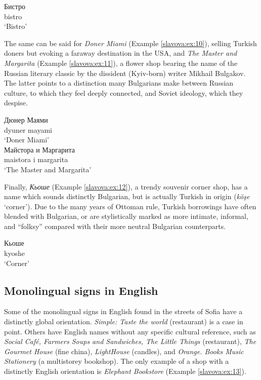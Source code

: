 \documentclass[output=paper]{langscibook}
\begin{document}
\begin{exe}
  \ex\label{slavova:ex:9}
  \gll Бистро \\
  bistro \\
  \glt ‘Bistro’
\end{exe}

The same can be said for \textit{Doner Miami} (Example \ref{slavova:ex:10}), selling Turkish doners but evoking a faraway destination in the USA, and \textit{The Master and Margarita} (Example \ref{slavova:ex:11}), a flower shop bearing the name of the Russian literary classic by the dissident (Kyiv-born) writer Mikhail Bulgakov. The latter points to a distinction many Bulgarians make between Russian culture, to which they feel deeply connected, and Soviet ideology, which they despise.

\begin{exe}
  \ex\label{slavova:ex:10}
  \gll Дюнер Маями \\
  dyuner mayami \\
  \glt ‘Doner Miami’ \\
  \ex\label{slavova:ex:11}
  \gll Майстора и Маргарита \\
  maistora i margarita \\
  \glt ‘The Master and Margarita’
\end{exe}


Finally, \textit{Кьоше} (Example \ref{slavova:ex:12}), a trendy souvenir corner shop, has a name which sounds distinctly Bulgarian, but is actually Turkish in origin (\textit{köşe} ‘corner’). Due to the many years of Ottoman rule, Turkish borrowings have often blended with Bulgarian, or are stylistically marked as more intimate, informal, and ``folksy'' compared with their more neutral Bulgarian counterparts.

\begin{exe}
  \ex\label{slavova:ex:12}
  \gll Кьоше \\
  kyoshe \\
  \glt ‘Corner’
\end{exe}

\subsection{Monolingual signs in English}
Some of the monolingual signs in English found in the streets of Sofia have a distinctly global orientation. \textit{Simple: Taste the world} (restaurant) is a case in point. Others have English names without any specific cultural reference, such as \textit{Social Café, Farmers Soups and Sandwiches, The Little Things} (restaurant), \textit{The Gourmet House} (fine china), \textit{LightHouse} (candles), and \textit{Orange. Books Music Stationery} (a multistorey bookshop). The only example of a shop with a distinctly English orientation is \textit{Elephant Bookstore} (Example \ref{slavova:ex:13}).
\end{document}
